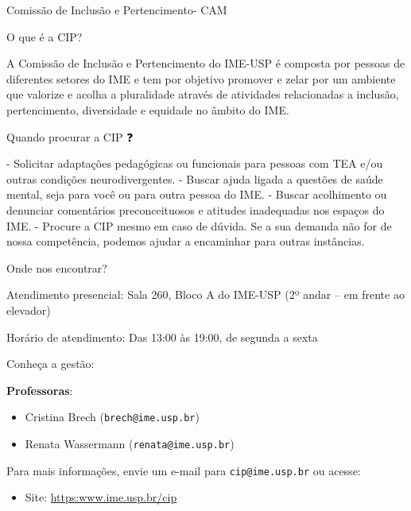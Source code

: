 \begin{subsecao}{Comissão de Inclusão e Pertencimento- CAM}

O que é a CIP?

A Comissão de Inclusão e Pertencimento do IME-USP é composta 
por pessoas de diferentes setores do IME e tem por objetivo promover e 
zelar por um ambiente que valorize e acolha a pluralidade através de atividades 
relacionadas a inclusão, pertencimento, diversidade e equidade no âmbito do IME.

Quando procurar a CIP ❓

- Solicitar adaptações pedagógicas ou funcionais para pessoas com TEA e/ou outras condições neurodivergentes.
- Buscar ajuda ligada a questões de saúde mental, seja para você ou para outra pessoa do IME.
- Buscar acolhimento ou denunciar comentários preconceituosos e atitudes inadequadas nos espaços do IME.
- Procure a CIP mesmo em caso de dúvida. Se a sua demanda não for de nossa competência, podemos ajudar a encaminhar para outras instâncias.

Onde nos encontrar?

Atendimento presencial:
Sala 260, Bloco A do IME-USP
(2º andar – em frente ao elevador)

Horário de atendimento:
Das 13:00 às 19:00, de segunda a sexta

Conheça a gestão: 

\textbf{Professoras}: 
\vspace{-15pt}
\begin{itemize}
  \item Cristina Brech ({\tt brech@ime.usp.br})
  \item Renata Wassermann ({\tt renata@ime.usp.br})
\end{itemize}

Para mais informações, envie um e-mail para {\tt cip@ime.usp.br} ou acesse:
\begin{itemize}
  \item Site: \url{https:www.ime.usp.br/cip}
\end{itemize}


\end{subsecao}